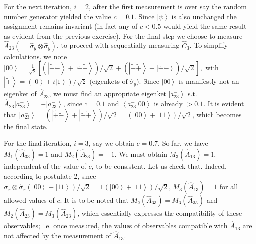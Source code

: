 \documentclass[doublecol,british]{epl2}
\theoremstyle{plain}
\theoremstyle{plain}
\theoremstyle{definition}
\theoremstyle{remark}
\theoremstyle{remark}
\theoremstyle{remark}
\theoremstyle{plain}
\theoremstyle{plain}
\theoremstyle{plain}
\theoremstyle{definition}
\theoremstyle{definition}
\begin{document}
For the next iteration, $i=2$, 
after the first measurement is over
say the random number generator yielded the value $c=0.1$.
Since $\left|\psi\right\rangle $ is also
unchanged
the assignment remains invariant (in fact any of
$c<0.5$ would yield the same result as
evident from the previous exercise). For the
final step we choose to measure
$\hat{A}_{23}(=\hat{\sigma}_{y}\otimes\hat{\sigma}_{y})$,
to proceed with sequentially measuring
$\hat{C}_{3}$. To simplify calculations, we note
$\left|00\right\rangle
=\frac{1}{\sqrt 2} \left[ \left(\left|\tilde{+}\tilde{-}\right\rangle
+\left|\tilde{-}\tilde{+}\right\rangle
\right)/\sqrt{2}+\left(\left|\tilde{+}\tilde{+}\right\rangle
+\left|\tilde{-}\tilde{-}\right\rangle
\right)/\sqrt{2}\right] , 
$
with
$\left|\tilde{\pm}\right\rangle
=(\left|0\right\rangle \pm i\left|1\right\rangle)/\sqrt{2} $
(eigenkets of $\hat{\sigma}_{y}$). Since
$\left|00\right\rangle$ is manifestly not an
eigenket of $\hat A_{23}$, we must find an appropriate
eigenket $\left|a^-_{23}\right\rangle $ s.t.
$\hat A_{23}\left|a^{-}_{23}\right\rangle
=-\left|a^{-}_{23}\right\rangle $, since $c=0.1$ and
$\left\langle a_{23}^{-}|00\right\rangle $ is already
$>0.1$. It is evident that
$\left|a^{-}_{23}\right\rangle
=\left(\left|\tilde{+}\tilde{-}\right\rangle
+\left|\tilde{-}\tilde{+}\right\rangle
\right)/\sqrt{2}=\left(\left|00\right\rangle
+\left|11\right\rangle \right)/\sqrt{2}$, which
becomes the final state. 


For the final
iteration, $i=3$, say we obtain $c=0.7$. So far,
we have $M_{1}(\hat{A}_{33})=1$ and
$M_{2}(\hat{A}_{23})=-1$. We must obtain
$M_{3}(\hat{A}_{13})=1$, independent of the value
of $c$, to be consistent. Let us check that.
Indeed, according to postulate 2, since
$\hat{\sigma}_{x}\otimes\hat{\sigma}_{x}\left(\left|00\right\rangle
+\left|11\right\rangle
\right)/\sqrt{2}=1\left(\left|00\right\rangle
+\left|11\right\rangle \right)/\sqrt{2}$,
$M_{3}(\hat{A}_{13})=1$ for all allowed values of
$c$. It is to be noted that
$M_{2}(\hat{A}_{33})=M_{3}(\hat{A}_{33})$ and
$M_{2}(\hat{A}_{23})=M_{3}(\hat{A}_{23})$, which
essentially expresses the compatibility of these
observables; i.e. 
once measured, the values of observables compatible
with $\hat{A}_{13}$ are not affected by the 
measurement of $\hat{A}_{13}$.
\end{document}
